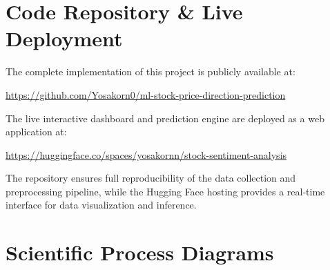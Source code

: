 \appendix

\chapter{Code Repository & Live Deployment}
The complete implementation of this project is publicly available at:

\begin{center}
\url{https://github.com/Yosakorn0/ml-stock-price-direction-prediction}

\vspace{0.5cm}

\end{center}

The live interactive dashboard and prediction engine are deployed as a web application at:

\begin{center}
\url{https://huggingface.co/spaces/yosakornn/stock-sentiment-analysis}

\vspace{0.5cm}

\end{center}

The repository ensures full reproducibility of the data collection and preprocessing pipeline, while the Hugging Face hosting provides a real-time interface for data visualization and inference.

\chapter{Scientific Process Diagrams}
\label{app:diagrams}

